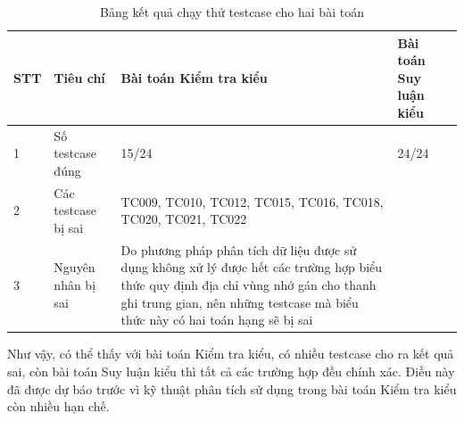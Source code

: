 \begin{table}[h!]
	\centering
	\begin{tabular}{ |p{0.7cm}| p{3cm}| p{5cm}| p{5cm}|}
		\hline
		
		STT & Tiêu chí & Bài toán Kiểm tra kiểu & Bài toán Suy luận kiểu\\
		\hline
		1 & Số testcase đúng & 15/24 & 24/24\\
		\hline
		2 & Các testcase bị sai &TC009, TC010, TC012, TC015, TC016, TC018, TC020, TC021, TC022 &\\
		\hline
		3 & Nguyên nhân bị sai & Do phương pháp phân tích dữ liệu được sử dụng không xử lý được hết các trường hợp biểu thức quy định địa chỉ vùng nhớ gán cho thanh ghi trung gian, nên những testcase mà biểu thức này có hai toán hạng sẽ bị sai & \\
		\hline
	\end{tabular}
	
	
	\label{table:table3}
	\caption{Bảng kết quả chạy thử testcase cho hai bài toán}
\end{table}
Như vậy, có thể thấy với bài toán Kiểm tra kiểu, có nhiều testcase cho ra kết quả sai, còn bài toán Suy luận kiểu thì tất cả các trường hợp đều chính xác. Điều này đã được dự báo trước vì kỹ thuật phân tích sử dụng trong bài toán Kiểm tra kiểu còn nhiều hạn chế.\\

